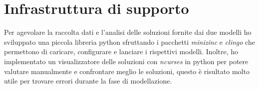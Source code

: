 
\section{Infrastruttura di supporto}
Per agevolare la raccolta dati e l'analisi delle soluzioni fornite dai due modelli ho sviluppato una piccola libreria python sfruttando i pacchetti \emph{minizinc} e \emph{clingo} che permettono di caricare, configurare e lanciare i rispettivi modelli.
Inoltre, ho implementato un visualizzatore delle soluzioni con \emph{ncurses} in python per potere valutare manualmente e confrontare meglio le soluzioni, questo è risultato molto utile per trovare errori durante la fase di modellazione.

